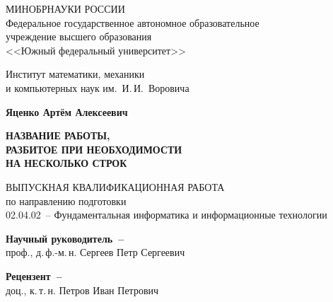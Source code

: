 


\thispagestyle{empty}
\begin{singlespacing}
    \begin{center}

        МИНОБРНАУКИ РОССИИ\\ [12pt]
        Федеральное государственное автономное образовательное\\
        учреждение высшего образования\\
        <<Южный федеральный университет>>

        \vspace{\baselineskip}
        Институт математики, механики\\
        и компьютерных наук им.~И.\,И.~Воровича


        \vfill
        \textbf{Яценко Артём Алексеевич}

        \vspace{15mm}
        {\bf НАЗВАНИЕ РАБОТЫ, \\
            РАЗБИТОЕ ПРИ НЕОБХОДИМОСТИ \\
            НА НЕСКОЛЬКО СТРОК }

        \vspace{15mm}
        ВЫПУСКНАЯ КВАЛИФИКАЦИОННАЯ РАБОТА\\
        по направлению подготовки\\
        02.04.02~-- Фундаментальная информатика и информационные технологии

        \vspace{10mm}
        \textbf{Научный руководитель~--}\\
        проф., д.\,ф.-м.\,н. Сергеев Петр Сергеевич

        \vspace{7mm}
        \textbf{Рецензент~--}\\
        доц., к.\,т.\,н. Петров Иван Петрович



\end{center}
\end{singlespacing}
